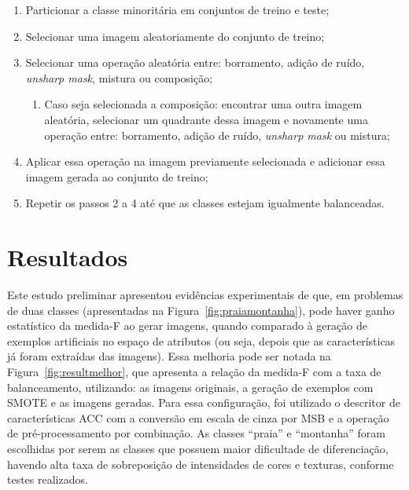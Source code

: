 \begin{enumerate}
\item Particionar a classe minoritária em conjuntos de treino e teste;
\item Selecionar uma imagem aleatoriamente do conjunto de treino;
\item Selecionar uma operação aleatória entre: borramento, adição de ruído, \textit{unsharp mask}, mistura ou composição;
\begin{enumerate}
\item Caso seja selecionada a composição: encontrar uma outra imagem aleatória, selecionar um quadrante dessa imagem e novamente uma operação entre: borramento, adição de ruído, \textit{unsharp mask} ou mistura;
\end{enumerate}
\item Aplicar essa operação na imagem previamente selecionada e adicionar essa imagem gerada ao conjunto de treino;
\item Repetir os passos 2 a 4 até que as classes estejam igualmente balanceadas.
\end{enumerate}

\section{Resultados}
\label{sec:resultadospreliminares}

Este estudo preliminar apresentou evidências experimentais de que, em problemas de duas classes (apresentadas na Figura~\ref{fig:praiamontanha}), pode haver ganho estatístico da medida-F ao gerar imagens, quando comparado à geração de exemplos artificiais no espaço de atributos (ou seja, depois que as características já foram extraídas das imagens). Essa melhoria pode ser notada na Figura~\ref{fig:resultmelhor}, que apresenta a relação da medida-F com a taxa de balanceamento, utilizando: as imagens originais, a geração de exemplos com SMOTE e as imagens geradas. Para essa configuração, foi utilizado o descritor de características ACC com a conversão em escala de cinza por MSB e a operação de pré-processamento por combinação. As classes ``praia'' e ``montanha'' foram escolhidas por serem as classes que possuem maior dificultade de diferenciação, havendo alta taxa de sobreposição de intensidades de cores e texturas, conforme testes realizados.

\vspace{20pt}

